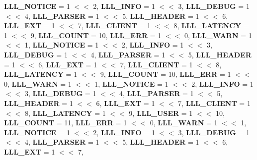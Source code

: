 \begin{DoxyCompactItemize}
{\bfseries L\+L\+L\+\_\+\+N\+O\+T\+I\+CE} = 1 $<$$<$ 2, 
\newline
{\bfseries L\+L\+L\+\_\+\+I\+N\+FO} = 1 $<$$<$ 3, 
{\bfseries L\+L\+L\+\_\+\+D\+E\+B\+UG} = 1 $<$$<$ 4, 
{\bfseries L\+L\+L\+\_\+\+P\+A\+R\+S\+ER} = 1 $<$$<$ 5, 
{\bfseries L\+L\+L\+\_\+\+H\+E\+A\+D\+ER} = 1 $<$$<$ 6, 
\newline
{\bfseries L\+L\+L\+\_\+\+E\+XT} = 1 $<$$<$ 7, 
{\bfseries L\+L\+L\+\_\+\+C\+L\+I\+E\+NT} = 1 $<$$<$ 8, 
{\bfseries L\+L\+L\+\_\+\+L\+A\+T\+E\+N\+CY} = 1 $<$$<$ 9, 
{\bfseries L\+L\+L\+\_\+\+C\+O\+U\+NT} = 10, 
\newline
{\bfseries L\+L\+L\+\_\+\+E\+RR} = 1 $<$$<$ 0, 
{\bfseries L\+L\+L\+\_\+\+W\+A\+RN} = 1 $<$$<$ 1, 
{\bfseries L\+L\+L\+\_\+\+N\+O\+T\+I\+CE} = 1 $<$$<$ 2, 
{\bfseries L\+L\+L\+\_\+\+I\+N\+FO} = 1 $<$$<$ 3, 
\newline
{\bfseries L\+L\+L\+\_\+\+D\+E\+B\+UG} = 1 $<$$<$ 4, 
{\bfseries L\+L\+L\+\_\+\+P\+A\+R\+S\+ER} = 1 $<$$<$ 5, 
{\bfseries L\+L\+L\+\_\+\+H\+E\+A\+D\+ER} = 1 $<$$<$ 6, 
{\bfseries L\+L\+L\+\_\+\+E\+XT} = 1 $<$$<$ 7, 
\newline
{\bfseries L\+L\+L\+\_\+\+C\+L\+I\+E\+NT} = 1 $<$$<$ 8, 
{\bfseries L\+L\+L\+\_\+\+L\+A\+T\+E\+N\+CY} = 1 $<$$<$ 9, 
{\bfseries L\+L\+L\+\_\+\+C\+O\+U\+NT} = 10, 
{\bfseries L\+L\+L\+\_\+\+E\+RR} = 1 $<$$<$ 0, 
\newline
{\bfseries L\+L\+L\+\_\+\+W\+A\+RN} = 1 $<$$<$ 1, 
{\bfseries L\+L\+L\+\_\+\+N\+O\+T\+I\+CE} = 1 $<$$<$ 2, 
{\bfseries L\+L\+L\+\_\+\+I\+N\+FO} = 1 $<$$<$ 3, 
{\bfseries L\+L\+L\+\_\+\+D\+E\+B\+UG} = 1 $<$$<$ 4, 
\newline
{\bfseries L\+L\+L\+\_\+\+P\+A\+R\+S\+ER} = 1 $<$$<$ 5, 
{\bfseries L\+L\+L\+\_\+\+H\+E\+A\+D\+ER} = 1 $<$$<$ 6, 
{\bfseries L\+L\+L\+\_\+\+E\+XT} = 1 $<$$<$ 7, 
{\bfseries L\+L\+L\+\_\+\+C\+L\+I\+E\+NT} = 1 $<$$<$ 8, 
\newline
{\bfseries L\+L\+L\+\_\+\+L\+A\+T\+E\+N\+CY} = 1 $<$$<$ 9, 
{\bfseries L\+L\+L\+\_\+\+U\+S\+ER} = 1 $<$$<$ 10, 
{\bfseries L\+L\+L\+\_\+\+C\+O\+U\+NT} = 11, 
{\bfseries L\+L\+L\+\_\+\+E\+RR} = 1 $<$$<$ 0, 
\newline
{\bfseries L\+L\+L\+\_\+\+W\+A\+RN} = 1 $<$$<$ 1, 
{\bfseries L\+L\+L\+\_\+\+N\+O\+T\+I\+CE} = 1 $<$$<$ 2, 
{\bfseries L\+L\+L\+\_\+\+I\+N\+FO} = 1 $<$$<$ 3, 
{\bfseries L\+L\+L\+\_\+\+D\+E\+B\+UG} = 1 $<$$<$ 4, 
\newline
{\bfseries L\+L\+L\+\_\+\+P\+A\+R\+S\+ER} = 1 $<$$<$ 5, 
{\bfseries L\+L\+L\+\_\+\+H\+E\+A\+D\+ER} = 1 $<$$<$ 6, 
{\bfseries L\+L\+L\+\_\+\+E\+XT} = 1 $<$$<$ 7, 
$$
\end{DoxyCompactItemize}
